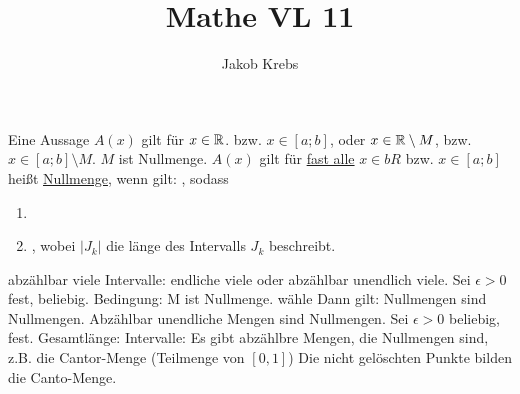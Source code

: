\documentclass{../tudscript}
\author{Jakob Krebs}
\title{Mathe VL 11}
\begin{document}
        Eine Aussage $A(x)$ gilt für $x \in \mathbb{R}$. bzw. $x \in [a; b]$,
        oder $x \in \mathbb{R} \setminus M$, bzw. $x \in [a;b] \setminus M$.
        $M$ ist Nullmenge.
        $A (x)$ gilt für \underline{fast alle} $x \in bR$ bzw. $x \in [a;b]$
        heißt \underline{Nullmenge}, wenn gilt:
        ,
        sodass
        \begin{enumerate}
        \item {}
        \item {},
               wobei $|J_k |$ die länge des Intervalls $J_k$ beschreibt.
        \end{enumerate}

            abzählbar viele Intervalle: endliche viele oder abzählbar unendlich viele.
            Sei $\epsilon > 0$ fest, beliebig.
            Bedingung: M ist Nullmenge.
            wähle
            Dann gilt:
            Nullmengen sind Nullmengen.
        Abzählbar unendliche Mengen sind Nullmengen.
            Sei $\epsilon > 0$ beliebig, fest.
            Gesamtlänge:
            Intervalle:
            Es gibt abzählbre Mengen, die Nullmengen sind,
            z.B. die Cantor-Menge (Teilmenge von $[0, 1]$)
            Die nicht gelöschten Punkte bilden die Canto-Menge.
\end{document}
